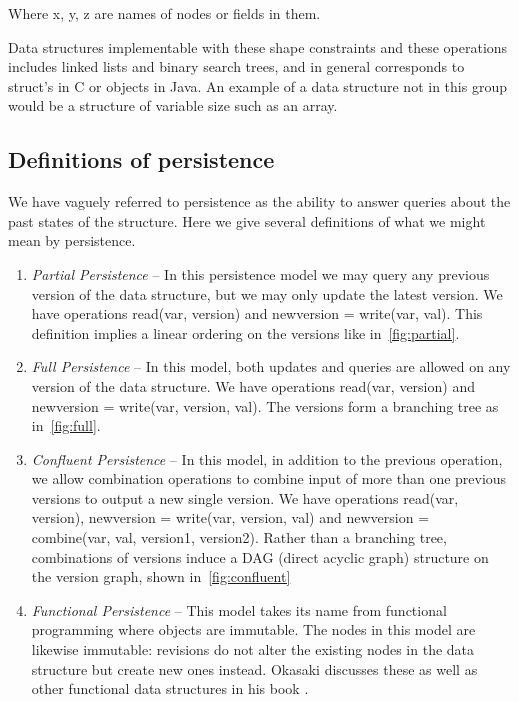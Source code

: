 \documentclass[11pt]{article}
\newcommand{\code}{\ttfamily}
\begin{document}
Where {\code x}, {\code y}, {\code z} are names of nodes or fields in them.

Data structures implementable with these shape constraints and these operations includes linked lists and binary search trees, and in general corresponds to {\code struct}'s in C or objects in Java. An example of a data structure not in this group would be a structure of variable size such as an array.

\subsection{Definitions of persistence}
We have vaguely referred to persistence as the ability to answer queries about the past states of the structure. Here we give several definitions of what we might mean by persistence.  

\begin{enumerate}
\item{\emph{Partial Persistence}} --
In this persistence model we may query any previous version of the data structure, but we may only update the latest version.  We have operations  {\code read(var, version)} and {\code newversion = write(var, val)}. This definition implies a linear ordering on the versions like in~\ref{fig:partial}.

\item{\emph{Full Persistence}} --
In this model, both updates and queries are allowed on any version of the data structure. We have operations {\code read(var, version)} and {\code newversion = write(var, version, val)}. The versions form a branching tree as in~\ref{fig:full}.

\item{\emph{Confluent Persistence}} --
In this model, in addition to the previous operation, we allow combination operations to combine input of more than one previous versions to output a new single version. We have operations {\code read(var, version)}, {\code newversion = write(var, version, val)} and {\code newversion = combine(var, val, version1, version2)}. Rather than a branching tree, combinations of versions induce a DAG (direct acyclic graph) structure on the version graph, shown in~\ref{fig:confluent}

\item{\emph{Functional Persistence}} --
This model takes its name from functional programming where objects are immutable. The nodes in this model are likewise immutable: revisions do not alter the
existing nodes in the data structure but create new ones instead. Okasaki discusses these as well as other functional data structures in his book \cite{okasaki}.

\end{enumerate}
\end{document}
